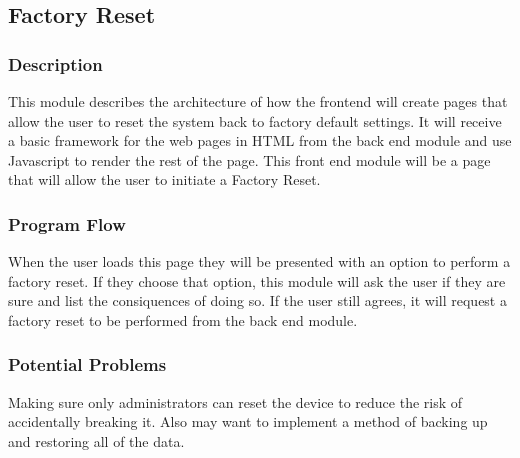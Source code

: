 
\subsection{Factory Reset}

\subsubsection{Description}

This module describes the architecture of how the frontend will create pages that allow the user to reset the system back to factory default settings.
It will receive a basic framework for the web pages in \ac{HTML} from the back end module and use Javascript to render the rest of the page. 
This front end module will be a page that will allow the user to initiate a Factory Reset.

\subsubsection{Program Flow}

When the user loads this page they will be presented with an option to perform a factory reset.
If they choose that option, this module will ask the user if they are sure and list the consiquences of doing so.
If the user still agrees, it will request a factory reset to be performed from the back end module.

\subsubsection{Potential Problems}

Making sure only administrators can reset the device to reduce the risk of accidentally breaking it.
Also may want to implement a method of backing up and restoring all of the data.
